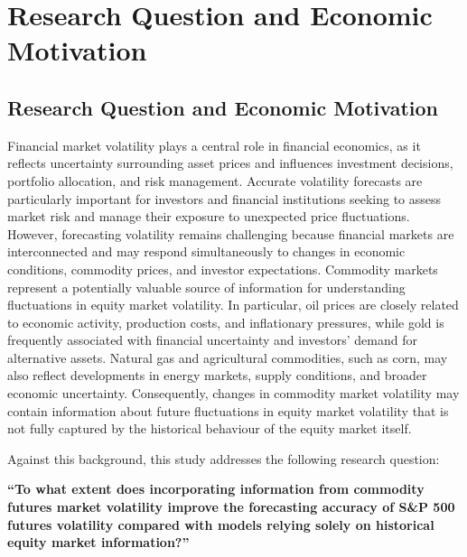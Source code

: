 \documentclass{report}
\begin{document}
\chapter{Research Question and Economic Motivation}

\section{Research Question and Economic Motivation}

Financial market volatility plays a central role in financial economics, as it reflects uncertainty surrounding asset prices and influences investment decisions, portfolio allocation, and risk management. Accurate volatility forecasts are particularly important for investors and financial institutions seeking to assess market risk and manage their exposure to unexpected price fluctuations. However, forecasting volatility remains challenging because financial markets are interconnected and may respond simultaneously to changes in economic conditions, commodity prices, and investor expectations.
\vspace{1em}
Commodity markets represent a potentially valuable source of information for understanding fluctuations in equity market volatility. In particular, oil prices are closely related to economic activity, production costs, and inflationary pressures, while gold is frequently associated with financial uncertainty and investors' demand for alternative assets. Natural gas and agricultural commodities, such as corn, may also reflect developments in energy markets, supply conditions, and broader economic uncertainty. Consequently, changes in commodity market volatility may contain information about future fluctuations in equity market volatility that is not fully captured by the historical behaviour of the equity market itself.

\vspace{1em}
Against this background, this study addresses the following research question:

\vspace{1em}

\textbf{“To what extent does incorporating information from commodity futures market volatility improve the forecasting accuracy of S&P 500 futures volatility compared with models relying solely on historical equity market information?”}
\end{document}

